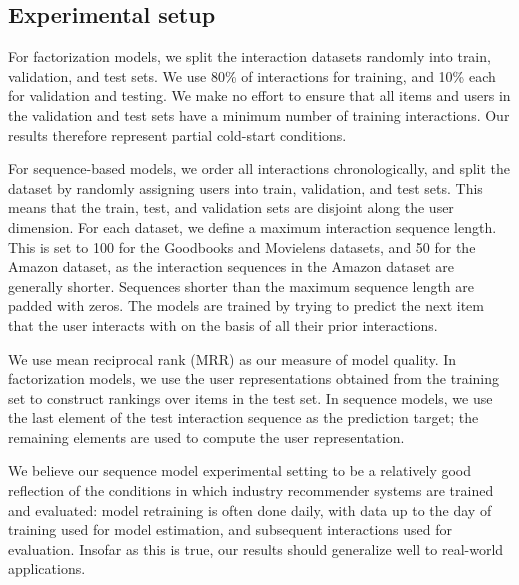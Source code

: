 \documentclass[sigconf]{acmart}
\begin{document}
\subsection{Experimental setup}
For factorization models, we split the interaction datasets randomly into train, validation, and test sets. We use 80\% of interactions for training, and 10\% each for validation and testing. We make no effort to ensure that all items and users in the validation and test sets have a minimum number of training interactions. Our results therefore represent partial cold-start conditions.

For sequence-based models, we order all interactions chronologically, and split the dataset by randomly assigning users into train, validation, and test sets. This means that the train, test, and validation sets are disjoint along the user dimension. For each dataset, we define a maximum interaction sequence length. This is set to 100 for the Goodbooks and Movielens datasets, and 50 for the Amazon dataset, as the interaction sequences in the Amazon dataset are generally shorter. Sequences shorter than the maximum sequence length are padded with zeros. The models are trained by trying to predict the next item that the user interacts with on the basis of all their prior interactions.

We use mean reciprocal rank (MRR) as our measure of model quality. In factorization models, we use the user representations obtained from the training set to construct rankings over items in the test set. In sequence models, we use the last element of the test interaction sequence as the prediction target; the remaining elements are used to compute the user representation.

We believe our sequence model experimental setting to be a relatively good reflection of the conditions in which industry recommender systems are trained and evaluated: model retraining is often done daily, with data up to the day of training used for model estimation, and subsequent interactions used for evaluation. Insofar as this is true, our results should generalize well to real-world applications.
\end{document}
